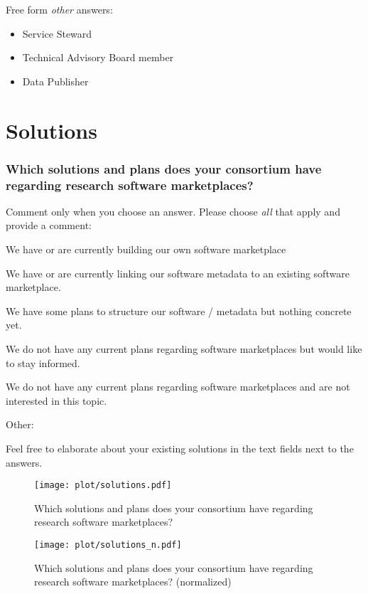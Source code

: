 \documentclass[headsepline,titlepage,twoside,12pt,toc=flat,headings=normal]{scrreprt}
\newcommand{\question}[1]{\subsubsection{#1}}
\newcommand{\otherbox}{\fbox{\phantom{This is how big an answer would be.}}}
\begin{document}
Free form \emph{other} answers:
\begin{itemize}
\item Service Steward
\item Technical Advisory Board member
\item Data Publisher
\end{itemize}

\section{Solutions}
\question{Which solutions and plans does your consortium have regarding research software marketplaces?}

Comment only when you choose an answer.
Please choose \emph{all} that apply and provide a comment:

\begin{answers}
\item We have or are currently building our own software marketplace
\item We have or are currently linking our software metadata to an existing software marketplace.
\item We have some plans to structure our software / metadata but nothing concrete yet.
\item We do not have any current plans regarding software marketplaces but would like to stay informed.
\item We do not have any current plans regarding software marketplaces and are not interested in this topic.
\item Other: \otherbox
\end{answers}

Feel free to elaborate about your existing solutions in the text fields
next to the answers.

\begin{figure}[h!]
\caption{Which solutions and plans does your consortium have regarding research software marketplaces?}
\label{fig:solutions}
\texttt{[image: plot/solutions.pdf]}
\end{figure}

\begin{figure}[h!]
\caption{Which solutions and plans does your consortium have regarding research software marketplaces? (normalized)}
\label{fig:solutions_n}
\texttt{[image: plot/solutions\_n.pdf]}
\end{figure}
\end{document}
